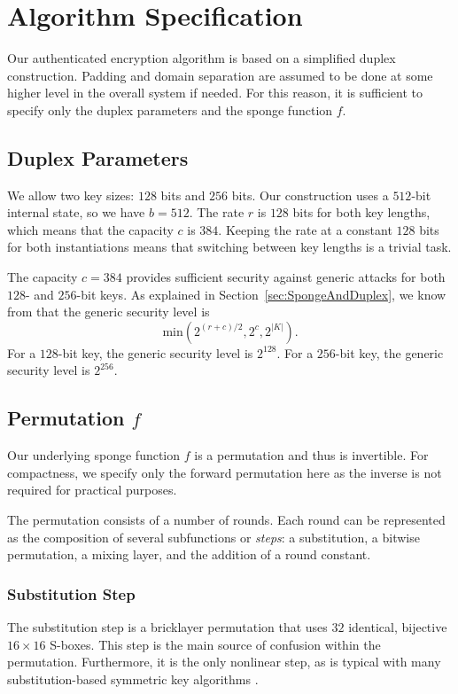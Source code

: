 \section{Algorithm Specification}
\label{sec:AlgorithmSpec}
Our authenticated encryption algorithm is based on a simplified duplex construction.
Padding and domain separation are assumed to be done at some higher level in the overall system if needed.
For this reason, it is sufficient to specify only the duplex parameters and the sponge function $f$.

%

\subsection{Duplex Parameters}
We allow two key sizes: $128$ bits and $256$ bits.
Our construction uses a $512$-bit internal state, so we have $b = 512$.
The rate $r$ is $128$ bits for both key lengths, which means that the capacity $c$ is $384$.
Keeping the rate at a constant $128$ bits for both instantiations means that switching between key lengths is a trivial task.

The capacity $c = 384$ provides sufficient security against generic attacks for both $128$- and $256$-bit keys.
As explained in Section~\ref{sec:SpongeAndDuplex}, we know from \cite{Jovanovic2014_Beyond} that the generic security level is
\begin{equation*}
\mathrm{min}(2^{(r+c)/2}, 2^c, 2^{|K|}).
\end{equation*}
For a $128$-bit key, the generic security level is $2^{128}$.
For a $256$-bit key, the generic security level is $2^{256}$. 

\subsection{Permutation $f$}
Our underlying sponge function $f$ is a permutation and thus is invertible.
For compactness, we specify only the forward permutation here as the inverse is not required for practical purposes.

The permutation consists of a number of rounds.
Each round can be represented as the composition of several subfunctions or \emph{steps}: a substitution, a bitwise permutation, a mixing layer, and the addition of a round constant.

\subsubsection{Substitution Step}
The substitution step is a bricklayer permutation that uses $32$ identical, bijective $16 \times 16$ S-boxes.
This step is the main source of confusion within the permutation.
Furthermore, it is the only nonlinear step, as is typical with many substitution-based symmetric key algorithms \cite{Stinson2006_CTAP}.

